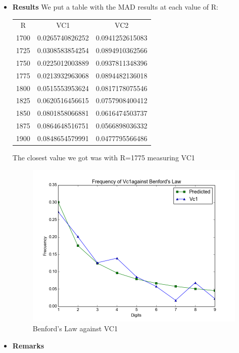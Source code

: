 \begin{itemize}
  \item \textbf{Results}
We put a table with the MAD results at each value of R:
\begin{center}
  \begin{tabular}{ c | c | c }
R & VC1 & VC2\\
1700 & 0.0265740826252 &0.0941252615083\\ \hline
1725 &  0.0308583854254& 0.0894910362566\\ \hline
1750 & 0.0225012003889 & 0.0937811348396\\ \hline
1775 &  0.0213932963068 & 0.0894482136018\\ \hline
1800 &  0.0515553953624& 0.0817178075546\\ \hline
1825 & 0.0620516456615 &0.0757908400412\\ \hline
1850& 0.0801858066881 &0.0616474503737\\ \hline
1875 & 0.0864648516751& 0.0566898036332\\ \hline
1900 &0.0848654579991 &0.0477795566486\\ \hline


  \end{tabular}
\end{center}

The closest value we got was with R=1775 measuring VC1
            \begin{figure}[h]
            \centering
            \includegraphics[scale=0.4]{imagenes/2-benford/benford_chua1775.png}
            \caption{Benford's Law against VC1}
            \end{figure}
  \item \textbf{Remarks}


\end{itemize}
